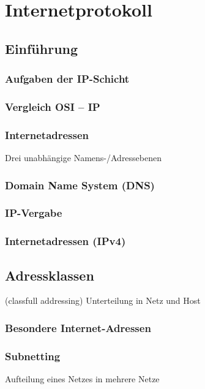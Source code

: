 \section{Internetprotokoll}
\subsection{Einführung}
\subsubsection{Aufgaben der IP-Schicht}
\subsubsection{Vergleich OSI -- IP}
\subsubsection{Internetadressen}
Drei unabhängige Namens-/Adressebenen
\subsubsection{Domain Name System (DNS)}

\subsubsection{IP-Vergabe}

\subsubsection{Internetadressen (IPv4)}
\subsection{Adressklassen}
(classfull addressing) Unterteilung in Netz und Host

\subsubsection{Besondere Internet-Adressen}
\subsubsection{Subnetting}
Aufteilung eines Netzes in mehrere Netze
